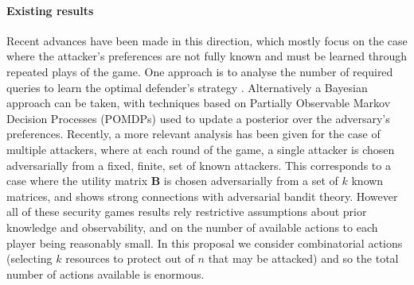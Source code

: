 \paragraph{Existing results}
Recent advances have been made in this direction, which mostly focus on the case where the attacker's preferences are not fully known and must be learned through repeated plays of the game. One approach is to analyse the number of required queries to learn the optimal defender's strategy \cite{blum2014learning, letchford2009learning}. 
Alternatively a Bayesian approach can be taken, with techniques based on Partially Observable Markov Decision Processes (POMDPs) used to update a posterior over the adversary's preferences\cite{Marecki12PR, qian2014online}. 
Recently, a more relevant analysis has been given\cite{Balcan15CR} for the case of multiple attackers, where at each round of the game, a single attacker is chosen adversarially from a fixed, finite, set of known attackers. This corresponds to a case where the utility matrix $\boldsymbol B$ is chosen adversarially from a set of $k$ known matrices, and shows strong connections with adversarial bandit theory.  However all of these security games results rely restrictive assumptions about prior knowledge and observability, and on the number of available actions to each player being reasonably small.  In this proposal we consider combinatorial actions (selecting $k$ resources to protect out of $n$ that may be attacked) and so the total number of actions available is enormous.


